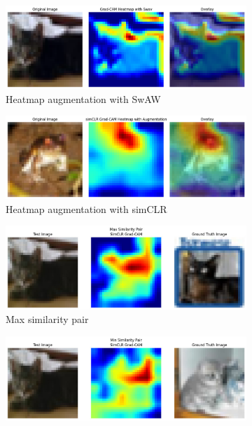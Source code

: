 \begin{figure}[h]
    \centering
    \begin{subfigure}{\linewidth}
        \includegraphics[width=\linewidth]{images/gc1.png}
        \caption{Heatmap augmentation with SwAW}
        \label{fig:gc1}
    \end{subfigure}\vspace{10pt}
    \begin{subfigure}{\linewidth}
        \includegraphics[width=\linewidth]{images/gc2.png}
        \caption{Heatmap augmentation with simCLR}
        \label{fig:gc2}
    \end{subfigure}\vspace{10pt}
    \begin{subfigure}{\linewidth}
        \includegraphics[width=\linewidth]{images/gc3.jpeg}
        \caption{Max similarity pair} 
        \label{fig:gc3}
    \end{subfigure}\vspace{10pt}
    \begin{subfigure}{\linewidth}
        \includegraphics[width=\linewidth]{images/gc4.jpeg}

\end{subfigure}
\end{figure}
